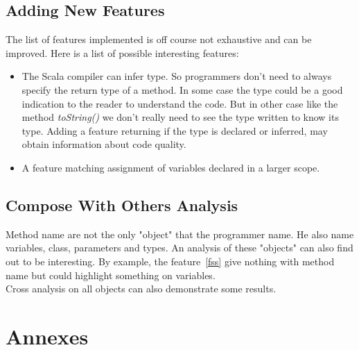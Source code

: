 \documentclass[12pt]{article}
\begin{document}
\subsection{Adding New Features}
The list of features implemented is off course not exhaustive and can be improved. Here is a list of possible interesting features:
\begin{itemize}
\item The Scala compiler can infer type. So programmers don't need to always specify the return type of a method. In some case the type could be a good indication to the reader to understand the code. But in other case like the method \textit{toString()} we don't really need to see the type written to know its type. Adding a feature returning if the type is declared or inferred, may obtain information about code quality.
\item A feature matching assignment of variables declared in a larger scope.
\end{itemize}
\subsection{Compose With Others Analysis}
Method name are not the only "object" that the programmer name. He also name variables, class, parameters and types. An analysis of these "objects" can also find out to be interesting. By example, the feature~\ref{fss} give nothing with method name but could highlight something on variables.\\
Cross analysis on all objects can also demonstrate some results.\\

\newpage
\section{Annexes}
\end{document}
